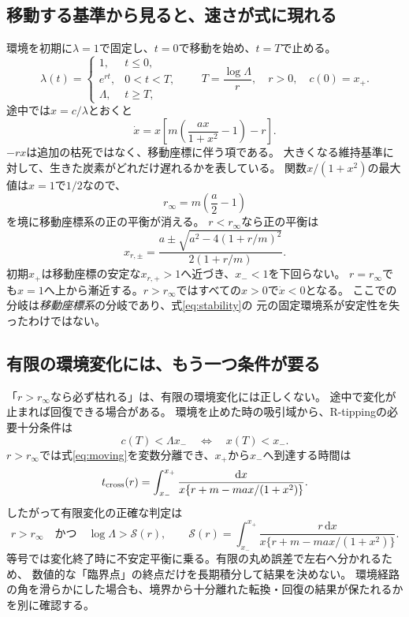 \documentclass[a4paper,11pt]{ltjsarticle}
\newcommand{\dd}{\mathrm d}
\begin{document}
\subsection{移動する基準から見ると、速さが式に現れる}
環境を初期に$\lambda=1$で固定し、$t=0$で移動を始め、$t=T$で止める。
\begin{equation}
\lambda(t)=\begin{cases}1,&t\leq0,\\e^{rt},&0<t<T,\\\Lambda,&t\geq T,\end{cases}
\qquad T=\frac{\log\Lambda}{r},\quad r>0,\quad c(0)=x_+.
\end{equation}
途中では$x=c/\lambda$とおくと
\begin{equation}\boxed{
\dot x=x\left[m\left(\frac{ax}{1+x^2}-1\right)-r\right].
}\label{eq:moving}
\end{equation}
$-rx$は追加の枯死ではなく、移動座標に伴う項である。
大きくなる維持基準に対して、生きた炭素がどれだけ遅れるかを表している。
関数$x/(1+x^2)$の最大値は$x=1$で$1/2$なので、
\begin{equation}
r_\infty=m\left(\frac a2-1\right)
\label{eq:infinite}
\end{equation}
を境に移動座標系の正の平衡が消える。
$r<r_\infty$なら正の平衡は
\begin{equation}
x_{r,\pm}=\frac{a\pm\sqrt{a^2-4(1+r/m)^2}}{2(1+r/m)}.
\end{equation}
初期$x_+$は移動座標の安定な$x_{r,+}>1$へ近づき、$x_-<1$を下回らない。
$r=r_\infty$でも$x=1$へ上から漸近する。$r>r_\infty$ではすべての$x>0$で$\dot x<0$となる。
ここでの分岐は\emph{移動座標系}の分岐であり、式\eqref{eq:stability}の
元の固定環境系が安定性を失ったわけではない。

\subsection{有限の環境変化には、もう一つ条件が要る}
「$r>r_\infty$なら必ず枯れる」は、有限の環境変化には正しくない。
途中で変化が止まれば回復できる場合がある。
環境を止めた時の吸引域から、R-tippingの必要十分条件は
\begin{equation}
c(T)<\Lambda x_-\quad\Longleftrightarrow\quad x(T)<x_-.
\label{eq:basin}
\end{equation}
$r>r_\infty$では式\eqref{eq:moving}を変数分離でき、$x_+$から$x_-$へ到達する時間は
\begin{equation}
t_{\rm cross}(r)=\int_{x_-}^{x_+}
\frac{\dd x}{x\{r+m-ma x/(1+x^2)\}}.
\label{eq:integral}
\end{equation}
したがって有限変化の正確な判定は
\begin{equation}\boxed{
r>r_\infty\quad\text{かつ}\quad
\log\Lambda>\mathcal S(r),\qquad
\mathcal S(r)=\int_{x_-}^{x_+}
\frac{r\,\dd x}{x\{r+m-ma x/(1+x^2)\}}.
}\label{eq:criterion}
\end{equation}
等号では変化終了時に不安定平衡に乗る。有限の丸め誤差で左右へ分かれるため、
数値的な「臨界点」の終点だけを長期積分して結果を決めない。
環境経路の角を滑らかにした場合も、境界から十分離れた転換・回復の結果が保たれるかを別に確認する。
\end{document}

